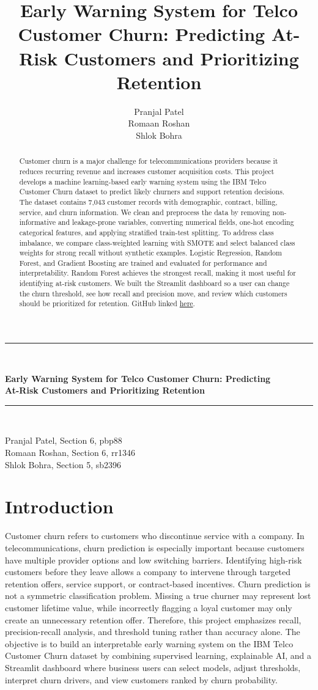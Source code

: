 \documentclass{article}
\title{Early Warning System for Telco Customer Churn: Predicting At-Risk Customers and Prioritizing Retention}
\author{%
  Pranjal Patel \\
  Romaan Roshan \\
  Shlok Bohra
}
\newcommand{\projecttitleblock}{%
\begin{center}
\vspace*{-0.15in}
\rule{0.92\linewidth}{2.4pt}\\[1.25em]
{\LARGE\bfseries Early Warning System for Telco Customer Churn: Predicting\\
At-Risk Customers and Prioritizing Retention\par}
\vspace{1.25em}
\rule{0.92\linewidth}{0.6pt}\\[1.15em]
{\normalsize Pranjal Patel, Section 6, pbp88\\Romaan Roshan, Section 6, rr1346\\Shlok Bohra, Section 5, sb2396\par}
\vspace{1.5em}
\end{center}
}
\begin{document}
\projecttitleblock

\begin{abstract}
Customer churn is a major challenge for telecommunications providers because it reduces recurring revenue and increases customer acquisition costs. This project develops a machine learning-based early warning system using the IBM Telco Customer Churn dataset to predict likely churners and support retention decisions. The dataset contains 7,043 customer records with demographic, contract, billing, service, and churn information. We clean and preprocess the data by removing non-informative and leakage-prone variables, converting numerical fields, one-hot encoding categorical features, and applying stratified train-test splitting. To address class imbalance, we compare class-weighted learning with SMOTE and select balanced class weights for strong recall without synthetic examples. Logistic Regression, Random Forest, and Gradient Boosting are trained and evaluated for performance and interpretability. Random Forest achieves the strongest recall, making it most useful for identifying at-risk customers. We built the Streamlit dashboard so a user can change the churn threshold, see how recall and precision move, and review which customers should be prioritized for retention.  GitHub linked \href{https://github.com/RomaanR/telco-churn-ews}{here}. 

\end{abstract}

\section{Introduction}
Customer churn refers to customers who discontinue service with a company. In telecommunications, churn prediction is especially important because customers have multiple provider options and low switching barriers. Identifying high-risk customers before they leave allows a company to intervene through targeted retention offers, service support, or contract-based incentives. Churn prediction is not a symmetric classification problem. Missing a true churner may represent lost customer lifetime value, while incorrectly flagging a loyal customer may only create an unnecessary retention offer. Therefore, this project emphasizes recall, precision-recall analysis, and threshold tuning rather than accuracy alone. The objective is to build an interpretable early warning system on the IBM Telco Customer Churn dataset by combining supervised learning, explainable AI, and a Streamlit dashboard where business users can select models, adjust thresholds, interpret churn drivers, and view customers ranked by churn probability.
\end{document}
